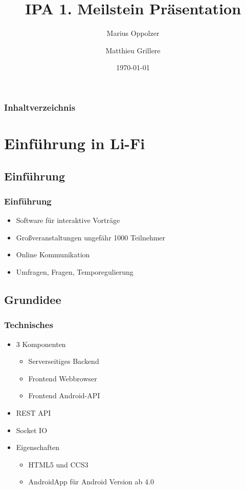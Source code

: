 \documentclass[german,a4paper]{beamer}
\title{IPA 1. Meilstein Pr\"{a}sentation}
\author{Marius Oppolzer \and Matthieu Grillere}
\date{\today}
\begin{document}
\maketitle{}
\begin{frame}
\frametitle{Inhaltverzeichnis}
\tableofcontents[pausesections]
\end{frame}
 
\section{Einf\"{u}hrung in Li-Fi}
\subsection{Einf\"{u}hrung}
\begin{frame} 
\frametitle{Einf\"{u}hrung}
\begin{itemize}
  \item 
  Software f\"{u}r interaktive Vortr\"{a}ge
  \item
  Gro{\ss}veranstaltungen ungef\"{a}hr 1000 Teilnehmer
  \item
  Online Kommunikation
  \item
  Umfragen, Fragen, Temporegulierung
\end{itemize}
\end{frame}

\subsection{Grundidee}
\begin{frame} 
\frametitle{Technisches}
\begin{itemize}
  \item 
  3 Komponenten
  \begin{itemize}
    \item
    Serverseitiges Backend
    \item
    Frontend Webbrowser
    \item
    Frontend Android-API
  \end{itemize}
  \item 
  REST API
  \item
  Socket IO
  \item
  Eigenschaften
  \begin{itemize}
    \item
    HTML5 und CCS3
    \item
    AndroidApp f\"{u}r Android Version ab 4.0
  \end{itemize}
\end{itemize}
\end{frame}
\end{document}
